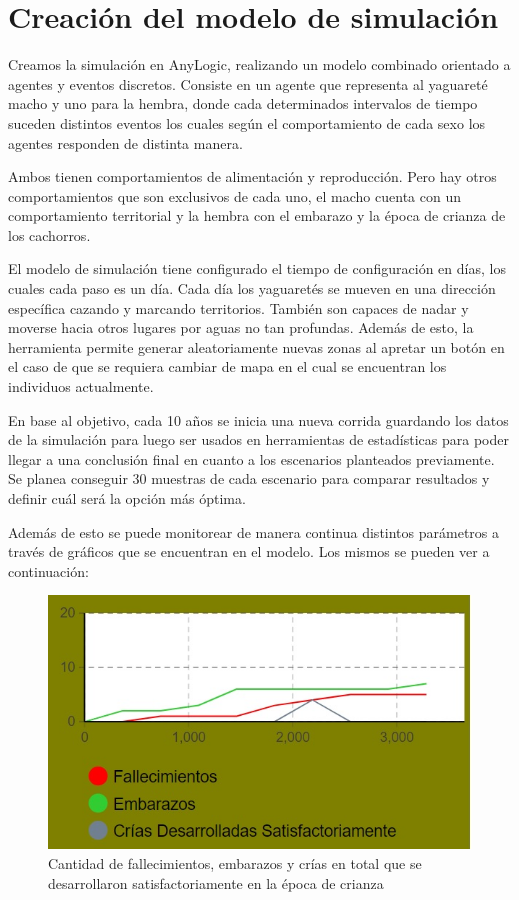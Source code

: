 \documentclass{article}
\begin{document}
    
\section{Creación del modelo de simulación}
    
    Creamos la simulación en AnyLogic, realizando un modelo combinado orientado a agentes y eventos discretos. Consiste en un agente que representa al yaguareté macho y uno para la hembra, donde cada determinados intervalos de tiempo suceden distintos eventos los cuales según el comportamiento de cada sexo los agentes responden de distinta manera.
    
    Ambos tienen comportamientos de alimentación y reproducción. Pero hay otros comportamientos que son exclusivos de cada uno, el macho cuenta con un comportamiento territorial y la hembra con el embarazo y la época de crianza de los cachorros.


    El modelo de simulación tiene configurado el tiempo de configuración en días, los cuales cada paso es un día. Cada día los yaguaretés se mueven en una dirección específica cazando y marcando territorios. También son capaces de nadar y moverse hacia otros lugares por aguas no tan profundas. Además de esto, la herramienta permite generar aleatoriamente nuevas zonas al apretar un botón en el caso de que se requiera cambiar de mapa en el cual se encuentran los individuos actualmente.

    En base al objetivo, cada 10 años se inicia una nueva corrida guardando los datos de la simulación para luego ser usados en herramientas de estadísticas para poder llegar a una conclusión final en cuanto a los escenarios planteados previamente. Se planea conseguir 30 muestras de cada escenario para comparar resultados y definir cuál será la opción más óptima.
    
    Además de esto se puede monitorear de manera continua distintos parámetros a través de gráficos que se encuentran en el modelo. 
    Los mismos se pueden ver a continuación:
    
    \begin{figure}[htbp]
        \centering
        \includegraphics{imagen1.jpg}
        \caption{Cantidad de fallecimientos, embarazos y crías en total que se desarrollaron satisfactoriamente en la época de crianza}
        \label{fig:my_label}
    \end{figure}
\end{document}
